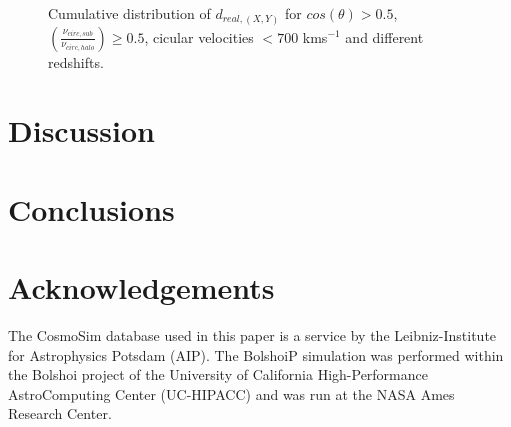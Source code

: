 \documentclass{emulateapj}
\begin{document}
\begin{figure*}
\begin{center}
\end{center}
\caption{Cumulative distribution of $d_{real, (X,Y)}$ for $cos(\theta)>0.5$, $\left(\frac{\nu_{circ,sub}}{\nu_{circ,halo}}\right)\geq0.5$, 
cicular velocities $<700$ kms$^{-1}$ and different redshifts.} 
\label{cumulative_cos}
\end{figure*}


\section{Discussion}
\label{sec:discussion}



\section{Conclusions}
\label{sec:conclusions}


\section*{Acknowledgements}

The CosmoSim database used in this paper is a service by the
Leibniz-Institute for Astrophysics Potsdam (AIP). The  BolshoiP
simulation was performed within the Bolshoi project of the University
of California High-Performance  AstroComputing Center (UC-HIPACC) and
was run at the NASA Ames Research Center. 



 
\end{document}

